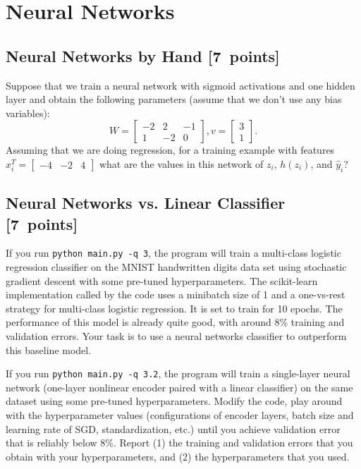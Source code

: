 \documentclass{article}
\newcommand{\blu}[1]{{\textcolor{blu}{#1}}}
\let\ask\blu
\newcommand\pts[1]{\textcolor{pointscolour}{[#1~points]}}
\newcommand{\mat}[1]{\begin{bmatrix}#1\end{bmatrix}}
\begin{document}
\section{Neural Networks}

\subsection{Neural Networks by Hand \pts{7}}

Suppose that we train a neural network with sigmoid activations and one hidden layer and obtain the following parameters (assume that we don't use any bias variables):
\[
W = \mat{-2 & 2 & -1\\1 & -2 & 0}, v = \mat{3 \\1}.
\]
Assuming that we are doing regression, \ask{for a training example with features $x_i^T = \mat{-4 &-2 & 4}$ what are the values in this network of $z_i$, $h(z_i)$, and $\hat{y}_i$?}

\subsection{Neural Networks vs. Linear Classifier \pts{7}}


If you run \texttt{python main.py -q 3}, the program will train a multi-class logistic regression classifier on the MNIST handwritten digits data set using stochastic gradient descent with some pre-tuned hyperparameters.
The scikit-learn implementation called by the code uses a minibatch size of 1 and a one-vs-rest strategy for multi-class logistic regression. It is set to train for 10 epochs.
The performance of this model is already quite good, with around 8\% training and validation errors. Your task is to use a neural networks classifier to outperform this baseline model.

If you run \texttt{python main.py -q 3.2}, the program will train a single-layer neural network (one-layer nonlinear encoder paired with a linear classifier) on the same dataset using some pre-tuned hyperparameters. Modify the code, play around with the hyperparameter values (configurations of encoder layers, batch size and learning rate of SGD, standardization, etc.) until you achieve validation error that is reliably below 8\%.
\ask{Report (1) the training and validation errors that you obtain with your hyperparameters, and (2) the hyperparameters that you used.}
\end{document}
